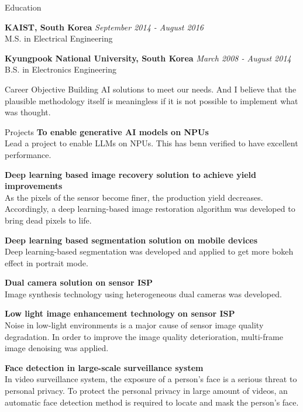 \documentclass{resume}
\begin{document}
\begin{rSection}{Education}

{\bf KAIST, South Korea} \hfill {\em September 2014 - August 2016} 
\\ M.S. in Electrical Engineering\hfill

{\bf Kyungpook National University, South Korea} \hfill {\em March 2008 - August 2014} 
\\ B.S. in Electronics Engineering\hfill 

\end{rSection}

\begin{rSection}{Career Objective}
 Building AI solutions to meet our needs.
 And I believe that the plausible methodology itself is meaningless if it is not possible to implement what was thought.
\end{rSection}

\begin{rSection}{Projects}
{\bf To enable generative AI models on NPUs}
\\ Lead a project to enable LLMs on NPUs. This has benn verified to have excellent performance.

{\bf Deep learning based image recovery solution to achieve yield improvements}
\\ As the pixels of the sensor become finer, the production yield decreases. Accordingly, a deep learning-based image restoration algorithm was developed to bring dead pixels to life.

{\bf Deep learning based segmentation solution on mobile devices}
\\ Deep learning-based segmentation was developed and applied to get more bokeh effect in portrait mode.

{\bf Dual camera solution on sensor ISP}
\\ Image synthesis technology using heterogeneous dual cameras was developed.

{\bf Low light image enhancement technology on sensor ISP}
\\ Noise in low-light environments is a major cause of sensor image quality degradation. In order to improve the image quality deterioration, multi-frame image denoising was applied.

{\bf Face detection in large-scale surveillance system }
\\ In video surveillance system, the exposure of a person’s face is a serious threat to personal privacy.
To protect the personal privacy in large amount of videos, an automatic face detection method is required to locate and mask the person’s face.

\end{rSection}
\end{document}
